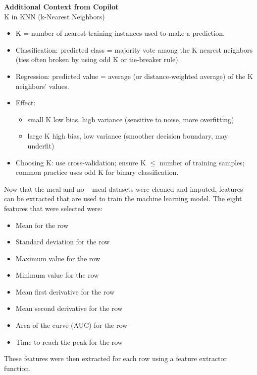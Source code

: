 \begin{framed}
\textbf{Additional Context from Copilot}\\
K in KNN (k‑Nearest Neighbors)

\begin{itemize}
\item K = number of nearest training instances used to make a prediction.
\item Classification: predicted class = majority vote among the K nearest neighbors (ties often broken by using odd K or tie‑breaker rule).
\item Regression: predicted value = average (or distance‑weighted average) of the K neighbors' values.
\item Effect:

\begin{itemize}
\item small K \rightarrow low bias, high variance (sensitive to noise, more overfitting)
\item large K \rightarrow high bias, low variance (smoother decision boundary, may underfit)
\end{itemize}


\item Choosing K: use cross‑validation; ensure K $\leq$ number of training samples; common practice uses odd K for binary classification.
\end{itemize}
\end{framed}

Now that the meal and no -- meal datasets were cleaned and imputed, features can be extracted that are used to train the machine learning model.  The eight features that were selected were:

\begin{itemize}
\item Mean for the row
\item Standard deviation for the row
\item Maximum value for the row
\item Minimum value for the row
\item Mean first derivative for the row
\item Mean second derivative for the row
\item Area of the curve (AUC) for the row
\item Time to reach the peak for the row
\end{itemize}

These features were then extracted for each row using a feature extractor function.

